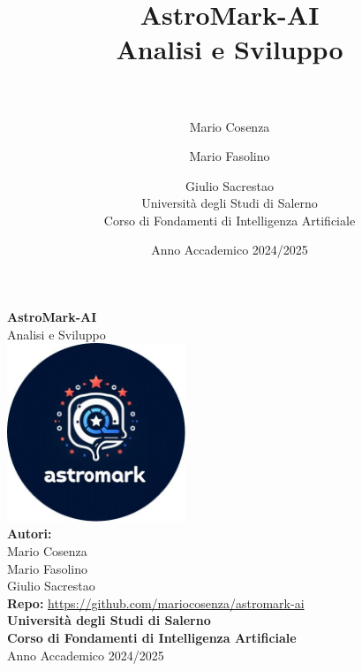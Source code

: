 \documentclass[a4paper,12pt]{report}
\title{%
  \textbf{AstroMark-AI}\\[0.5cm]
  \large Analisi e Sviluppo\\[0.5cm]

  \\
}
\author{%
  Mario Cosenza \and
  Mario Fasolino \and
  Giulio Sacrestao\\[0.5cm]
  Università degli Studi di Salerno\\
  Corso di Fondamenti di Intelligenza Artificiale%
}
\date{Anno Accademico 2024/2025}
\begin{document}
\begin{titlepage}
    \centering
    \vspace*{2cm}
    {\Huge \textbf{AstroMark-AI}}\\[1.5cm]
    {\Large Analisi e Sviluppo}\\[2cm]
    \includegraphics[width=0.4\textwidth]{images/astromarkLogo.jpg}\\[2cm]
    {\large \textbf{Autori:}}\\[0.5cm]
    Mario Cosenza\\
    Mario Fasolino\\
    Giulio Sacrestao\\[1cm]
    {\small \textbf{Repo:} \url{https://github.com/mariocosenza/astromark-ai}}\\[1cm]
    {\large \textbf{Università degli Studi di Salerno}}\\[0.5cm]
    {\large \textbf{Corso di Fondamenti di Intelligenza Artificiale}}\\[1cm]
    {\large Anno Accademico 2024/2025}
    \vfill
\end{titlepage}

\newpage

\pagestyle{fancy}
\fancyhf{}
\fancyfoot[C]{\thepage}

\tableofcontents
\newpage











\appendix

\end{document}
